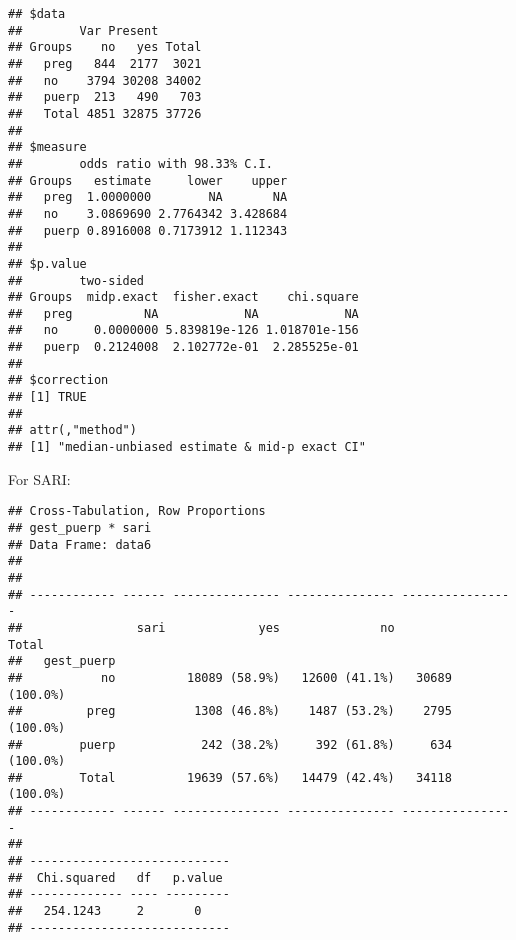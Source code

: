 \documentclass[
]{article}
\newenvironment{Shaded}{\begin{snugshade}}{\end{snugshade}}
\newcommand{\DataTypeTok}[1]{\textcolor[rgb]{0.13,0.29,0.53}{#1}}
\newcommand{\KeywordTok}[1]{\textcolor[rgb]{0.13,0.29,0.53}{\textbf{#1}}}
\newcommand{\NormalTok}[1]{#1}
\newcommand{\OperatorTok}[1]{\textcolor[rgb]{0.81,0.36,0.00}{\textbf{#1}}}
\newcommand{\OtherTok}[1]{\textcolor[rgb]{0.56,0.35,0.01}{#1}}
\newcommand{\StringTok}[1]{\textcolor[rgb]{0.31,0.60,0.02}{#1}}
\begin{document}
\begin{verbatim}
## $data
##        Var Present
## Groups    no   yes Total
##   preg   844  2177  3021
##   no    3794 30208 34002
##   puerp  213   490   703
##   Total 4851 32875 37726
## 
## $measure
##        odds ratio with 98.33% C.I.
## Groups   estimate     lower    upper
##   preg  1.0000000        NA       NA
##   no    3.0869690 2.7764342 3.428684
##   puerp 0.8916008 0.7173912 1.112343
## 
## $p.value
##        two-sided
## Groups  midp.exact  fisher.exact    chi.square
##   preg          NA            NA            NA
##   no     0.0000000 5.839819e-126 1.018701e-156
##   puerp  0.2124008  2.102772e-01  2.285525e-01
## 
## $correction
## [1] TRUE
## 
## attr(,"method")
## [1] "median-unbiased estimate & mid-p exact CI"
\end{verbatim}

For SARI:

\begin{Shaded}
\end{Shaded}

\begin{verbatim}
## Cross-Tabulation, Row Proportions  
## gest_puerp * sari  
## Data Frame: data6  
## 
## 
## ------------ ------ --------------- --------------- ----------------
##                sari             yes              no            Total
##   gest_puerp                                                        
##           no          18089 (58.9%)   12600 (41.1%)   30689 (100.0%)
##         preg           1308 (46.8%)    1487 (53.2%)    2795 (100.0%)
##        puerp            242 (38.2%)     392 (61.8%)     634 (100.0%)
##        Total          19639 (57.6%)   14479 (42.4%)   34118 (100.0%)
## ------------ ------ --------------- --------------- ----------------
## 
## ----------------------------
##  Chi.squared   df   p.value 
## ------------- ---- ---------
##   254.1243     2       0    
## ----------------------------
\end{verbatim}

\begin{Shaded}
\end{Shaded}
\end{document}
